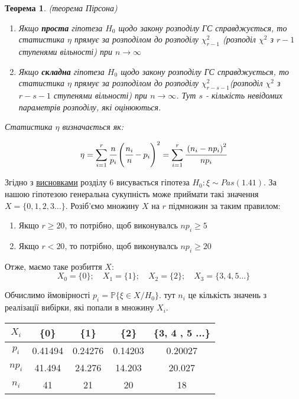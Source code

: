 \documentclass[a5paper, 20pt]{article}
\newtheorem{theorem}{Теорема}
\begin{document}
\begin{theorem}
(теорема Пірсона) 

\begin{enumerate}
\item Якщо \textbf{проста} гіпотеза $H_0$ щодо закону розподілу ГС справджується, то статистика $\eta$ прямує за розподілом до розподілу $\chi_{r-1}^2$ (розподіл $\chi^2$ з $r-1$ ступенями вільності) при $n \to \infty$

\item Якщо \textbf{складна} гіпотеза $H_0$ щодо закону розподілу ГС справджується, то статистика $\eta$ прямує за розподілом до розподілу $\chi_{r-s-1}^2$(розподіл $\chi^2$ з $r-s-1$ ступенями вільності) при $n \to \infty$. Тут $s$ - кількість невідомих параметрів розподілу, які оцінюються.
\end{enumerate} 

Статистика $\eta$ визначається як:

$$ \eta = \sum \limits_{i=1}^{r} \cfrac{n}{p_i} \left( \cfrac{n_i}{n} - p_i \right)^2 = \sum \limits_{i=1}^{r} \cfrac{\left( n_i - np_i \right)^2}{np_i} $$ 

\end{theorem}

Згідно з \hyperlink{s}{висновками} розділу 6 висувається гіпотеза $H_0: \xi \sim Pas(1.41)$. За нашою гіпотезою генеральна сукупність може приймати такі значення $X = \{0, 1, 2, 3 \dots \}$. Розіб'ємо множину $X$ на $r$ підмножин за таким правилом:

\begin{enumerate}

\item Якщо $r \geqslant 20$, то потрібно, щоб виконувалсь $np_i \geqslant 5$

\item Якщо $r < 20$, то потрібно, щоб виконувалсь $np_i \geqslant 20$

\end{enumerate}

Отже, маємо таке розбиття $X$:
\vspace{5mm}
$$X_0 = \{0\}; \quad X_1 = \{1\}; \quad X_2 = \{2 \};  \quad X_3 = \{3,4,5 \dots \}$$

\vspace{5mm}
Обчислимо ймовірності $p_i = \mathbb{P} \{\xi \in X / H_0\}$. тут $n_i$ це кількість значень з реалізації вибірки, які попали в множину $X_i$. 

\begin{center}
\begin{tabular}{| c | c | c | c | c |}
\hline
$X_i$ & \{0\} & \{1\} & \{2\} & \{3, 4 , 5 ...\} \\ \hline
$p_i$ & 0.41494 & 0.24276 & 0.14203 & 0.20027 \\ \hline
$np_i$ & 41.494 & 24.276 & 14.203 & 20.027 \\ \hline
$n_i$ & 41 & 21 & 20 & 18 \\ \hline
\end{tabular}
\end{center}
\end{document}
